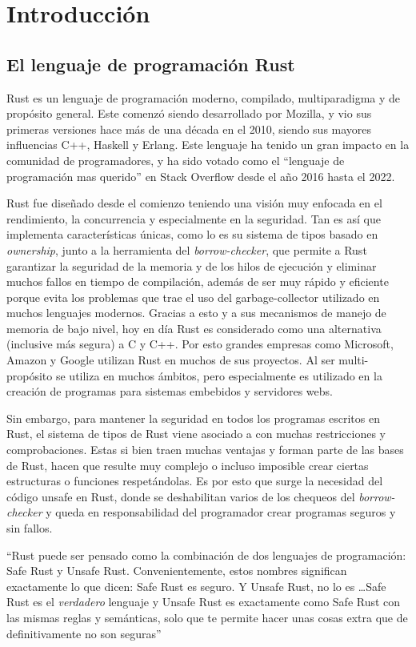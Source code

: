 \chapter{Introducción}

\section{El lenguaje de programación Rust}

Rust es un lenguaje de programación moderno, compilado, multiparadigma y de propósito general. Este comenzó siendo desarrollado por Mozilla, y vio sus primeras versiones hace más de una década en el 2010, siendo sus mayores influencias C++, Haskell y Erlang. Este lenguaje ha tenido un gran impacto en la comunidad de programadores, y ha sido votado como el “lenguaje de programación mas querido” en Stack Overflow desde el año 2016 hasta el 2022.

Rust fue diseñado desde el comienzo teniendo una visión muy enfocada en el rendimiento, la concurrencia y especialmente en la seguridad. Tan es así que implementa características únicas, como lo es su sistema de tipos basado en \textit{ownership}, junto a la herramienta del \textit{borrow-checker}, que permite a Rust garantizar la seguridad de la memoria y de los hilos de ejecución y eliminar muchos fallos en tiempo de compilación, además de ser muy rápido y eficiente porque evita los problemas que trae el uso del garbage-collector utilizado en muchos lenguajes modernos. Gracias a esto y a sus mecanismos de manejo de memoria de bajo nivel, hoy en día Rust es considerado como una alternativa (inclusive más segura) a C y C++. Por esto grandes empresas como Microsoft, Amazon y Google utilizan Rust en muchos de sus proyectos. Al ser multi-propósito se utiliza en muchos ámbitos, pero especialmente es utilizado en la creación de programas para sistemas embebidos y servidores webs.

Sin embargo, para mantener la seguridad en todos los programas escritos en Rust, el sistema de tipos de Rust viene asociado a con muchas restricciones y comprobaciones. Estas si bien traen muchas ventajas y forman parte de las bases de Rust, hacen que resulte muy complejo o incluso imposible crear ciertas estructuras o funciones respetándolas. Es por esto que surge la necesidad del código unsafe en Rust, donde se deshabilitan varios de los chequeos del \textit{borrow-checker} y queda en responsabilidad del programador crear programas seguros y sin fallos.

``Rust puede ser pensado como la combinación de dos lenguajes de programación: Safe Rust y Unsafe Rust. Convenientemente, estos nombres significan exactamente lo que dicen: Safe Rust es seguro. Y Unsafe Rust, no lo es \dots Safe Rust es el \textit{verdadero} lenguaje y Unsafe Rust es exactamente como Safe Rust con las mismas reglas y semánticas, solo que te permite hacer unas cosas extra que de definitivamente no son seguras'' \citep{rustonomicon}

